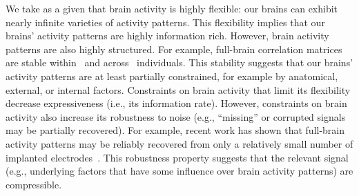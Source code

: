 \documentclass[english, 11pt]{article}
\begin{document}
We take as a given that brain activity is highly flexible: our brains can
exhibit nearly infinite varieties of activity patterns. This flexibility
implies that our brains' activity patterns are highly information rich. However,
brain activity patterns are also highly structured. For example, full-brain
correlation matrices are stable within~\citep{FinnEtal15, FinnEtal17,
GratEtal18} and across~\citep{YeoEtal11, GlerEtal12, GratEtal18, ColeEtal14}
individuals. This stability suggests that our brains' activity patterns are at
least partially constrained, for example by anatomical, external, or internal
factors. Constraints on brain activity that limit its flexibility decrease
expressiveness (i.e., its information rate). However, constraints on brain
activity also increase its robustness to noise (e.g., ``missing'' or corrupted
signals may be partially recovered). For example, recent work has shown that
full-brain activity patterns may be reliably recovered from only a relatively
small number of implanted electrodes~\citep{OwenEtal20, ScanEtal21}. This
robustness property suggests that the relevant signal (e.g., underlying factors
that have some influence over brain activity patterns) are compressible.
\end{document}
